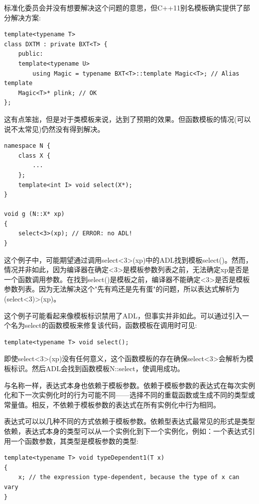 标准化委员会并没有想要解决这个问题的意思，但C++11别名模板确实提供了部分解决方案:

\begin{lstlisting}[style=styleCXX]
template<typename T>
class DXTM : private BXT<T> {
	public:
	template<typename U>
		using Magic = typename BXT<T>::template Magic<T>; // Alias template
	Magic<T>* plink; // OK
};
\end{lstlisting}

这有点笨拙，但是对于类模板来说，达到了预期的效果。但函数模板的情况(可以说不太常见)仍然没有得到解决。


\begin{lstlisting}[style=styleCXX]
namespace N {
	class X {
		...
	};
	template<int I> void select(X*);
}

void g (N::X* xp)
{
	select<3>(xp); // ERROR: no ADL!
}
\end{lstlisting}

这个例子中，可能期望通过调用select<3>(xp)中的ADL找到模板select()。然而，情况并非如此，因为编译器在确定<3>是模板参数列表之前，无法确定xp是否是一个函数调用参数。在找到select()是模板之前，编译器不能确定<3>是否是模板参数列表。因为无法解决这个"先有鸡还是先有蛋"的问题，所以表达式解析为(select<3)>(xp)。

这个例子可能看起来像模板标识禁用了ADL，但事实并非如此。可以通过引入一个名为select的函数模板来修复该代码，函数模板在调用时可见:

\begin{lstlisting}[style=styleCXX]
template<typename T> void select();
\end{lstlisting}

即使select<3>(xp)没有任何意义，这个函数模板的存在确保select<3>会解析为模板标识。然后ADL会找到函数模板N::select，使调用成功。


与名称一样，表达式本身也依赖于模板参数。依赖于模板参数的表达式在每次实例化和下一次实例化时的行为可能不同——选择不同的重载函数或生成不同的类型或常量值。相反，不依赖于模板参数的表达式在所有实例化中行为相同。

表达式可以以几种不同的方式依赖于模板参数。依赖型表达式最常见的形式是类型依赖，表达式本身的类型可以从一个实例化到下一个实例化，例如：一个表达式引用一个函数参数，其类型是模板参数的类型:

\begin{lstlisting}[style=styleCXX]
template<typename T> void typeDependent1(T x)
{
	x; // the expression type-dependent, because the type of x can vary
}
\end{lstlisting}

